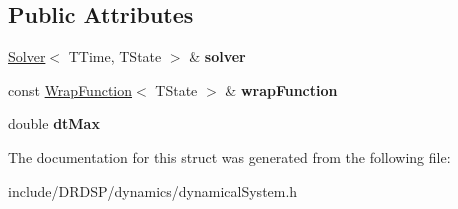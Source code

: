 \subsection*{Public Attributes}
\begin{DoxyCompactItemize}
\item 
\hypertarget{struct_d_r_d_s_p_1_1_continuous_dynamical_system_a2fd6dbc179354bd4972c19c0c39de7ca}{\hyperlink{struct_d_r_d_s_p_1_1_solver}{Solver}$<$ T\-Time, T\-State $>$ \& {\bfseries solver}}\label{struct_d_r_d_s_p_1_1_continuous_dynamical_system_a2fd6dbc179354bd4972c19c0c39de7ca}

\item 
\hypertarget{struct_d_r_d_s_p_1_1_continuous_dynamical_system_a1aef26b908300f0d10d0fd8f8e92d974}{const \hyperlink{struct_d_r_d_s_p_1_1_wrap_function}{Wrap\-Function}$<$ T\-State $>$ \& {\bfseries wrap\-Function}}\label{struct_d_r_d_s_p_1_1_continuous_dynamical_system_a1aef26b908300f0d10d0fd8f8e92d974}

\item 
\hypertarget{struct_d_r_d_s_p_1_1_continuous_dynamical_system_a1b58189b0f6cfd9ebfe3eea51695276a}{double {\bfseries dt\-Max}}\label{struct_d_r_d_s_p_1_1_continuous_dynamical_system_a1b58189b0f6cfd9ebfe3eea51695276a}

\end{DoxyCompactItemize}


The documentation for this struct was generated from the following file\-:\begin{DoxyCompactItemize}
\item 
include/\-D\-R\-D\-S\-P/dynamics/dynamical\-System.\-h\end{DoxyCompactItemize}
